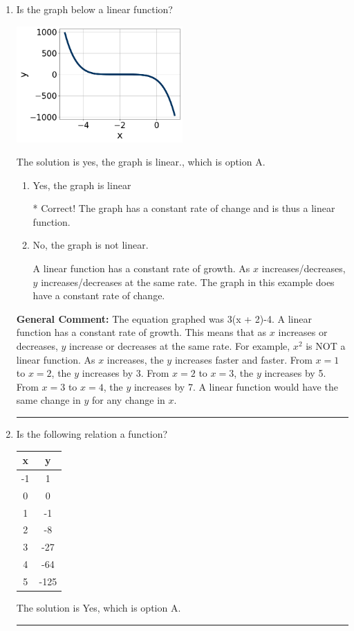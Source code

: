 \documentclass{extbook}[14pt]
\newcommand{\litem}[1]{\item #1

\rule{\textwidth}{0.4pt}}
\begin{document}
\begin{enumerate}\litem{
Is the graph below a linear function?

\begin{center}
    \includegraphics[width=0.5\textwidth]{../Figures/MA_8_F_1_2_graphC.png}
\end{center}


The solution is yes, the graph is linear., which is option A.

\begin{enumerate}[label=\Alph*.]
\item Yes, the graph is linear

* Correct! The graph has a constant rate of change and is thus a linear function.
\item No, the graph is not linear.

A linear function has a constant rate of growth. As $x$ increases/decreases, $y$ increases/decreases at the same rate. The graph in this example does have a constant rate of change.
\end{enumerate}


\textbf{General Comment:} The equation graphed was 3(x + 2)-4. A linear function has a constant rate of growth. This means that as $x$ increases or decreases, $y$ increase or decreases at the same rate. For example, $x^2$ is NOT a linear function. As $x$ increases, the $y$ increases faster and faster. From $x=1$ to $x=2$, the $y$ increases by 3. From $x=2$ to $x=3$, the $y$ increases by 5. From $x=3$ to $x=4$, the $y$ increases by 7. A linear function would have the same change in $y$ for any change in $x$.
}
\litem{
Is the following relation a function?


\begin{tabular}{c|c}
x &y\tabularnewline \hline
-1 &1\tabularnewline \hline
0 &0\tabularnewline \hline
1 &-1\tabularnewline \hline
2 &-8\tabularnewline \hline
3 &-27\tabularnewline \hline
4 &-64\tabularnewline \hline
5 &-125\end{tabular}The solution is Yes, which is option A.

}
\end{enumerate}
\end{document}
